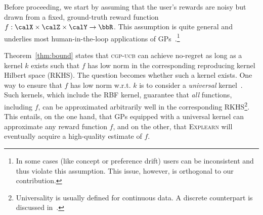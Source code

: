 \documentclass[letterpaper]{article} %
\newcommand{\explearn}{\textsc{Explearn}\xspace}
\newcommand{\cgpucb}{\textsc{cgp-ucb}\xspace}
\begin{document}
Before proceeding, we start by assuming that the user's rewards are noisy but drawn from a fixed, ground-truth reward function $f: \calX \times \calZ \times \calY \to \bbR$.  This assumption is quite general and underlies most human-in-the-loop applications of GPs~\cite{guo2010gaussian,wilson2015human}.\footnote{In some cases (like concept or preference drift) users can be inconsistent and thus violate this assumption.  This issue, however, is orthogonal to our contribution.}%

Theorem~\ref{thm:bound} states that \cgpucb can achieve no-regret as long as a kernel $k$ exists such that $f$ has low norm in the corresponding reproducing kernel Hilbert space (RKHS).  The question becomes whether such a kernel exists.  One way to ensure that $f$ has low norm w.r.t. $k$ is to consider a \emph{universal} kernel~\cite{steinwart2001influence}.  Such kernels, which include the RBF kernel, guarantee that \emph{all} functions, including $f$, can be approximated arbitrarily well in the corresponding RKHS\footnote{Universality is usually defined for continuous data.  A discrete counterpart is discussed in~\cite{sriperumbudur2011universality}.}.  This entails, on the one hand, that GPs equipped with a universal kernel can approximate any reward function $f$, and on the other, that \explearn will eventually acquire a high-quality estimate of $f$.
\end{document}
